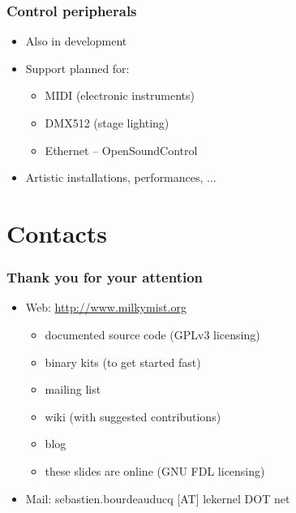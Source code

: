\documentclass{beamer}
\begin{document}
\frame
{
  \frametitle{Control peripherals}
  
  \begin{itemize}
  \item Also in development
  \item Support planned for:
  \begin{itemize}
  \item MIDI (electronic instruments)
  \item DMX512 (stage lighting)
  \item Ethernet -- OpenSoundControl
  \end{itemize}
  \item Artistic installations, performances, ...
  \end{itemize}
}


\section{Contacts}
\frame
{
  \frametitle{Thank you for your attention}
  \begin{itemize}
  \item Web: \url{http://www.milkymist.org}
  \begin{itemize}
  \item documented source code (GPLv3 licensing)
  \item binary kits (to get started fast)
  \item mailing list
  \item wiki (with suggested contributions)
  \item blog
  \item these slides are online (GNU FDL licensing)
  \end{itemize}
  \item Mail: sebastien.bourdeauducq [AT] lekernel DOT net
  \end{itemize}

  \begin{center}
  \end{center}
}
\end{document}
